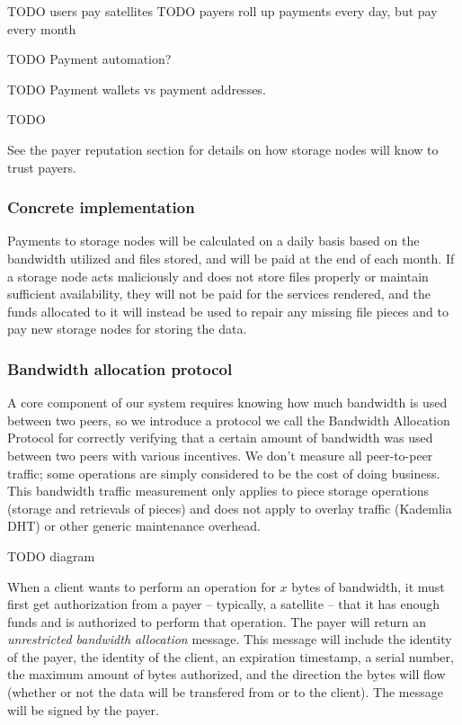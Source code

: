 \documentclass[a4paper,10pt]{article} \usepackage[utf8]{inputenc}
\newcommand{\todo}[1]{{\color{red} TODO #1 }}
\begin{document}
\todo{users pay satellites}
\todo{payers roll up payments every day, but pay every month}

\todo{Payment automation?}

\todo{Payment wallets vs payment addresses. }

\todo{}

See the payer reputation section for details on
how storage nodes will know to trust payers.

\subsubsection{Concrete implementation}

Payments to storage nodes will be calculated on a daily basis based on the 
bandwidth
utilized and files stored, and will be paid at the end of each month. 
If a storage node acts
maliciously and does not store files properly or maintain sufficient
availability, they will not be paid for the services rendered, and the funds
allocated to it will instead be used to repair any missing
file pieces and to pay new storage nodes for storing the data.

\subsubsection{Bandwidth allocation protocol}

A core component of our system requires knowing how much bandwidth is used
between two peers, so we introduce a protocol we call the Bandwidth Allocation
Protocol for correctly verifying that a certain amount of bandwidth was used
between two peers with various incentives. 
We don't measure all peer-to-peer traffic; 
some operations are simply considered to be
the cost of doing business. This bandwidth traffic measurement only applies
to piece storage operations (storage and retrievals of pieces) and does not
apply to overlay traffic (Kademlia DHT) or other generic maintenance overhead.

\todo{diagram}

When a client wants to perform an operation for $x$ bytes of bandwidth, it must
first get authorization from a payer -- typically, a satellite -- 
that it has enough funds and is authorized to perform that operation. 
The payer will return an {\em unrestricted
bandwidth allocation} message. This message will include the identity of the
payer, the identity of the client, an expiration timestamp, a serial number,
the maximum amount of bytes authorized, and the direction the bytes will flow
(whether or not the data will be transfered from or to the client).
The message will be signed by the payer. 
\end{document}
